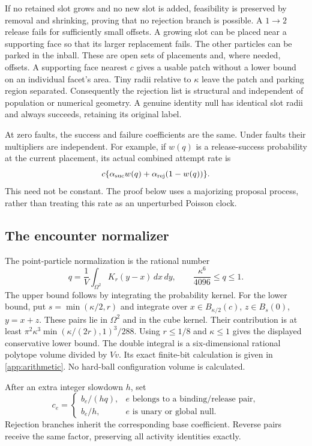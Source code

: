 \documentclass[11pt]{article}
\numberwithin{equation}{section}
\theoremstyle{definition}
\theoremstyle{remark}\newtheorem{remark}[theorem]{Remark}
\newcommand{\dd}{\,d}
\begin{document}
If no retained slot grows and no new slot is added, feasibility is preserved
by removal and shrinking, proving that no rejection branch is possible.
A $1\to2$ release fails for sufficiently small offsets. A growing slot can
be placed near a supporting face so that its larger replacement fails.
The other particles can be parked in the inball. These are open sets of
placements and, where needed, offsets. A supporting face nearest $c$ gives
a usable patch without a lower bound on an individual facet's area. Tiny
radii relative to $\kappa$ leave the patch and parking region separated.
Consequently the rejection list is structural and independent of population
or numerical geometry. A genuine identity null has identical slot radii and
always succeeds, retaining its original label.

At zero faults, the success and failure coefficients are the same. Under
faults their multipliers are independent. For example, if $w(q)$ is a
release-success probability at the current placement, its actual combined
attempt rate is
\[
 c\{\alpha_{\rm suc}w(q)+\alpha_{\rm rej}(1-w(q))\}.
\]
This need not be constant. The proof below uses a majorizing proposal
process, rather than treating this rate as an unperturbed Poisson clock.

\subsection{The encounter normalizer}

The point-particle normalization is the rational number
\begin{equation}\label{eq:q}
 q=\frac1V\int_{\Omega^2}K_r(y-x)\dd x\dd y,
 \qquad \frac{\kappa^6}{4096}\le q\le1.
\end{equation}
The upper bound follows by integrating the probability kernel. For the
lower bound, put $s=\min(\kappa/2,r)$ and integrate over
$x\in B_{\kappa/2}(c)$, $z\in B_s(0)$, $y=x+z$. These pairs lie in
$\Omega^2$ and in the cube kernel. Their contribution is at least
$\pi^2\kappa^3\min(\kappa/(2r),1)^3/288$. Using $r\le1/8$ and
$\kappa\le1$ gives the displayed conservative lower bound.
The double integral is a six-dimensional rational polytope volume divided
by $Vv$. Its exact finite-bit calculation is given in
\cref{app:arithmetic}. No hard-ball configuration volume is calculated.

After an extra integer slowdown $h$, set
\begin{equation}\label{eq:spatialrates}
 c_e=\begin{cases}b_e/(hq),&e\text{ belongs to a binding/release pair},\\
                  b_e/h,&e\text{ is unary or global null}.
       \end{cases}
\end{equation}
Rejection branches inherit the corresponding base coefficient. Reverse
pairs receive the same factor, preserving all activity identities exactly.
\end{document}
